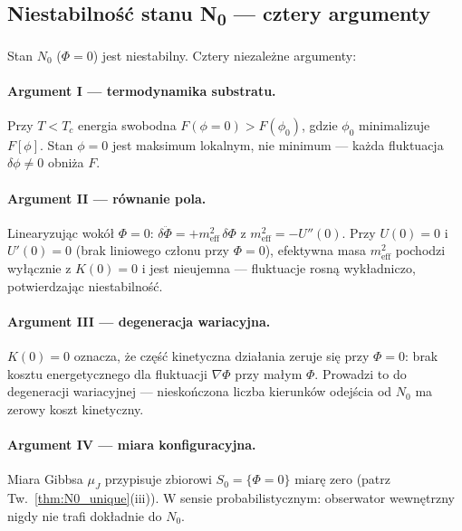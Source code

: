 \subsection{Niestabilność stanu N\textsubscript{0} — cztery argumenty}
\label{subsec:N0_instability}

\begin{twierdzenie}[Niestabilność $N_0$]
\label{thm:N0_instability}
Stan $N_0$ ($\Phi = 0$) jest niestabilny. Cztery niezależne argumenty:
\end{twierdzenie}

\paragraph{Argument I — termodynamika substratu.}
Przy $T < T_c$ energia swobodna $F(\phi=0) > F(\phi_0)$, gdzie $\phi_0$
minimalizuje $F[\phi]$. Stan $\phi = 0$ jest maksimum lokalnym, nie minimum —
każda fluktuacja $\delta\phi \neq 0$ obniża $F$.

\paragraph{Argument II — równanie pola.}
Linearyzując wokół $\Phi = 0$: $\delta\ddot\Phi = +m_\mathrm{eff}^2\,\delta\Phi$
z $m_\mathrm{eff}^2 = -U''(0)$. Przy $U(0) = 0$ i $U'(0) = 0$
(brak liniowego członu przy $\Phi = 0$), efektywna masa $m_\mathrm{eff}^2$
pochodzi wyłącznie z $K(0) = 0$ i jest nieujemna — fluktuacje rosną
wykładniczo, potwierdzając niestabilność.

\paragraph{Argument III — degeneracja wariacyjna.}
$K(0) = 0$ oznacza, że cz\k{e}ść kinetyczna działania zeruje się przy $\Phi = 0$:
brak kosztu energetycznego dla fluktuacji $\nabla\Phi$ przy małym $\Phi$.
Prowadzi to do degeneracji wariacyjnej — nieskończona liczba kierunków
odejścia od $N_0$ ma zerowy koszt kinetyczny.

\paragraph{Argument IV — miara konfiguracyjna.}
Miara Gibbsa $\mu_J$ przypisuje zbiorowi $S_0 = \{\Phi = 0\}$ miarę zero
(patrz Tw.~\ref{thm:N0_unique}(iii)). W sensie probabilistycznym: obserwator
wewnętrzny nigdy nie trafi dokładnie do $N_0$.

